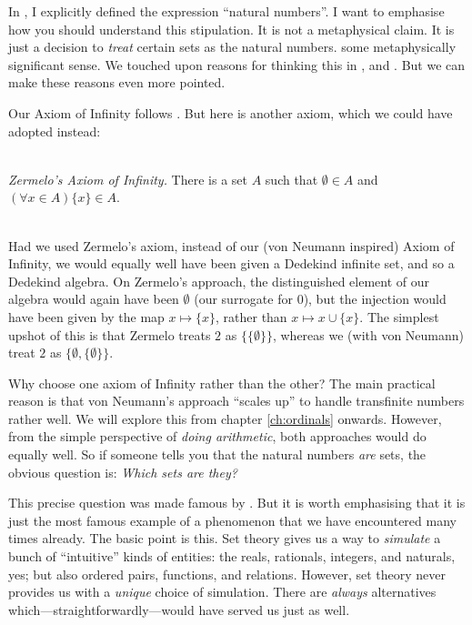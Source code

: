 \documentclass[../../../include/open-logic-section]{subfiles}
\begin{document}
	
In , I explicitly defined  the expression ``natural numbers''. I want to emphasise how you should understand this stipulation. It is not a metaphysical claim. It is just a decision to \emph{treat} certain sets as the natural numbers. some metaphysically significant sense. We touched upon reasons for thinking this in ,  and . But we can make these reasons even more pointed.

Our Axiom of Infinity follows \cite{VonNeumann1925}. But here is another axiom, which we could have adopted instead:

\
\\\emph{Zermelo's \citeyear{Zermelo1908Untersuchungen} Axiom of Infinity.} There is a set $A$ such that $\emptyset \in A$ and $(\forall x \in A)\{x\} \in A$. 

\
\\
Had we used Zermelo's axiom, instead of our (von Neumann inspired) Axiom of Infinity, we would equally well have been given a Dedekind infinite set, and so a Dedekind algebra. On Zermelo's approach, the distinguished element of our algebra would again have been $\emptyset$ (our surrogate for $0$), but the injection would have been given by the map $x \mapsto \{x\}$, rather than $x \mapsto x \cup \{x\}$. The simplest upshot of this is that Zermelo treats $2$ as $\{\{\emptyset\}\}$, whereas we (with von Neumann) treat $2$ as $\{\emptyset, \{\emptyset\}\}$. 

Why choose one axiom of Infinity rather than the other? The main practical reason is that von Neumann's approach ``scales up'' to handle transfinite numbers rather well. We will explore this from chapter \ref{ch:ordinals} onwards. However, from the simple perspective of \emph{doing arithmetic}, both approaches would do equally well. So if someone tells you that the natural numbers \emph{are} sets, the obvious question is: \emph{Which sets are they?} 

This precise question was made famous by \citet{Benacerraf1965}. But it is worth emphasising that it is just the most famous example of a phenomenon that we have encountered many times already. The basic point is this. Set theory gives us a way to \emph{simulate} a bunch of ``intuitive'' kinds of entities: the reals, rationals, integers, and naturals, yes; but also ordered pairs, functions, and relations. However, set theory never provides us with a \emph{unique} choice of simulation. There are \emph{always} alternatives which---straightforwardly---would have served us just as well. 
\end{document}
